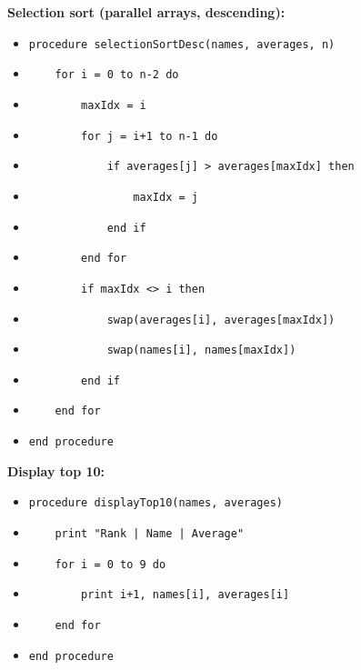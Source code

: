 \documentclass[11pt]{article}
\begin{document}
\begin{methode}
\textbf{Selection sort (parallel arrays, descending):}
\begin{itemize}
    \item \texttt{procedure selectionSortDesc(names, averages, n)}
    \item \texttt{~~~~for i = 0 to n-2 do}
    \item \texttt{~~~~~~~~maxIdx = i}
    \item \texttt{~~~~~~~~for j = i+1 to n-1 do}
    \item \texttt{~~~~~~~~~~~~if averages[j] > averages[maxIdx] then}
    \item \texttt{~~~~~~~~~~~~~~~~maxIdx = j}
    \item \texttt{~~~~~~~~~~~~end if}
    \item \texttt{~~~~~~~~end for}
    \item \texttt{~~~~~~~~if maxIdx <> i then}
    \item \texttt{~~~~~~~~~~~~swap(averages[i], averages[maxIdx])}
    \item \texttt{~~~~~~~~~~~~swap(names[i], names[maxIdx])}
    \item \texttt{~~~~~~~~end if}
    \item \texttt{~~~~end for}
    \item \texttt{end procedure}
\end{itemize}

\textbf{Display top 10:}
\begin{itemize}
    \item \texttt{procedure displayTop10(names, averages)}
    \item \texttt{~~~~print "Rank | Name | Average"}
    \item \texttt{~~~~for i = 0 to 9 do}
    \item \texttt{~~~~~~~~print i+1, names[i], averages[i]}
    \item \texttt{~~~~end for}
    \item \texttt{end procedure}
\end{itemize}
\end{methode}
\end{document}
